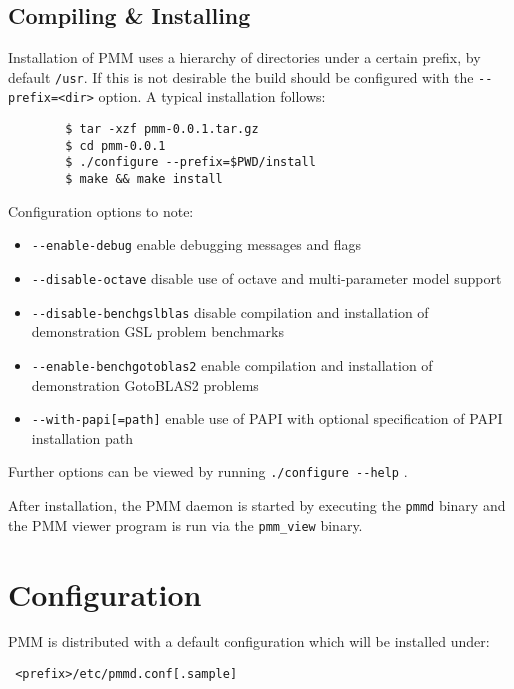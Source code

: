 \documentclass[a4paper,12pt]{report}
\begin{document}
    \section{Compiling \& Installing}
    Installation of PMM uses a hierarchy of directories under a certain prefix,
    by default \verb+/usr+. If this is not desirable the build should be
    configured with the \verb+--prefix=<dir>+ option. A typical installation
    follows:

    \begin{verbatim}
        $ tar -xzf pmm-0.0.1.tar.gz
        $ cd pmm-0.0.1
        $ ./configure --prefix=$PWD/install
        $ make && make install
    \end{verbatim}

    \noindent Configuration options to note:

    \begin{itemize}
        \item \verb+--enable-debug+ enable debugging messages and flags
        \item \verb+--disable-octave+ disable use of octave and multi-parameter
            model support
        \item \verb+--disable-benchgslblas+ disable compilation and
            installation of demonstration GSL problem benchmarks
        \item \verb+--enable-benchgotoblas2+ enable compilation and
            installation of demonstration GotoBLAS2 problems
        \item \verb+--with-papi[=path]+ enable use of PAPI with optional
            specification of PAPI installation path
    \end{itemize}

    \noindent Further options can be viewed by running \verb+./configure --help+
    .

    After installation, the PMM daemon is started by executing the
    \verb+pmmd+ binary and the PMM viewer program is run via the \verb+pmm_view+
    binary.


    \chapter{Configuration}
    \label{config_chap}
    PMM is distributed with a default configuration which will be installed under:
    \begin{verbatim} <prefix>/etc/pmmd.conf[.sample] \end{verbatim}
\end{document}
